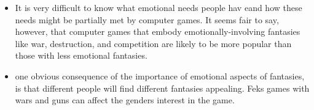 \begin{itemize}
        \begin{itemize}
          \item It is very difficult to know what emotional needs people hav eand how these needs might be partially met by computer games. It seems fair to say, however, that computer games that embody emotionally-involving fantasies like war, destruction, and competition are likely to be more popular than those with less emotional fantasies. 
          \item one obvious consequence of the importance of emotional aspects of fantasies, is that different people will find different fantasies appealing. Feks games with wars and guns can affect the genders interest in the game.  
        \end{itemize}
    \end{itemize}


